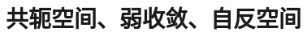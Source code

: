 \begin{enumerate}[leftmargin=2cm, label=\arabic*]

        

    
\end{enumerate}




\section{共轭空间、弱收敛、自反空间}
